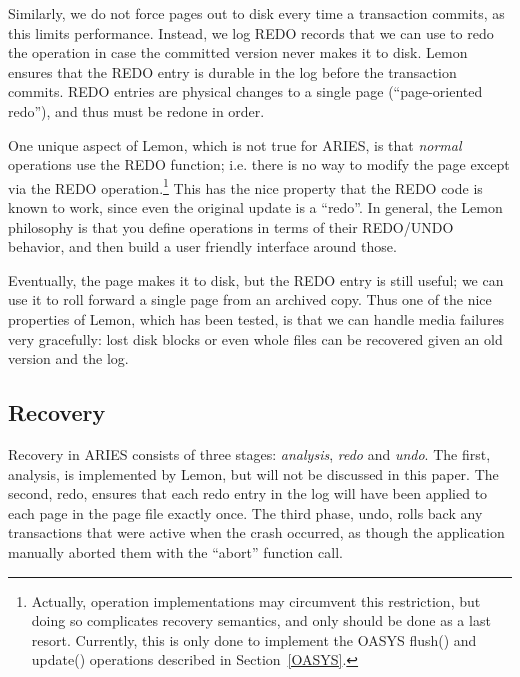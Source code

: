 \documentclass[letterpaper,twocolumn,english]{article}
\newcommand{\yad}{Lemon\xspace}
\begin{document}
Similarly, we do not force pages out to disk every time a transaction
commits, as this limits performance.  Instead, we log REDO records
that we can use to redo the operation in case the committed version never
makes it to disk.  \yad ensures that the REDO entry is durable in the
log before the transaction commits.  REDO entries are physical changes
to a single page (``page-oriented redo''), and thus must be redone in
order.

One unique aspect of \yad, which is not true for ARIES, is that {\em
normal} operations use the REDO function; i.e. there is no way to
modify the page except via the REDO operation.\footnote{Actually,
operation implementations may circumvent this restriction, but doing
so complicates recovery semantics, and only should be done as a last
resort.  Currently, this is only done to implement the OASYS flush()
and update() operations described in Section~\ref{OASYS}.}  This has
the nice property that the REDO code is known to work, since even the
original update is a ``redo''.  In general, the \yad philosophy is
that you define operations in terms of their REDO/UNDO behavior, and
then build a user friendly interface around those.

Eventually, the page makes it to disk, but the REDO entry is still
useful; we can use it to roll forward a single page from an archived
copy.  Thus one of the nice properties of \yad, which has been
tested, is that we can handle media failures very gracefully: lost
disk blocks or even whole files can be recovered given an old version
and the log.  

\subsection{Recovery}

%

Recovery in ARIES consists of three stages: {\em analysis}, {\em redo} and {\em undo}. 
The first, analysis, is
implemented by \yad, but will not be discussed in this
paper. The second, redo, ensures that each redo entry in the log 
will have been applied to each page in the page file exactly once.
The third phase, undo, rolls back any transactions that were active
when the crash occurred, as though the application manually aborted
them with the {}``abort'' function call.
  
\end{document}
